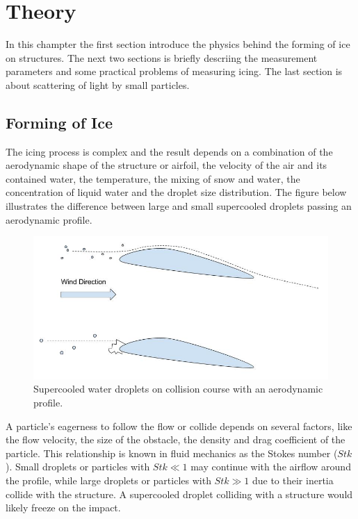
\chapter{Theory}
\label{chap:theory}

In this champter the first section introduce the physics behind the forming of ice on structures. The next two sections is briefly descriing the measurement parameters and some practical problems of measuring icing. The last section is about scattering of light by small particles.

\section{Forming of Ice}

The icing process is complex and the result depends on a combination of the aerodynamic shape of the structure or airfoil, the velocity of the air and its contained water, the temperature, the mixing of snow and water, the concentration of liquid water and the droplet size distribution. The figure below illustrates the difference between large and small supercooled droplets passing an aerodynamic profile.

\begin{figure}%
\centering\includegraphics[width=0.8\linewidth]{./figures/freezing_droplets.jpg}
\caption{Supercooled water droplets on collision course with an aerodynamic profile.}
\end{figure}

A particle’s eagerness to follow the flow or collide depends on several factors, like the flow velocity, the size of the obstacle, the density and drag coefficient of the particle. This relationship is known in fluid mechanics as the Stokes number ($Stk$). Small droplets or particles with $Stk \ll1$ may continue with the airflow around the profile, while large droplets or particles with $Stk \gg 1$ due to their inertia collide with the structure. A supercooled droplet colliding with a structure would likely freeze on the impact.

